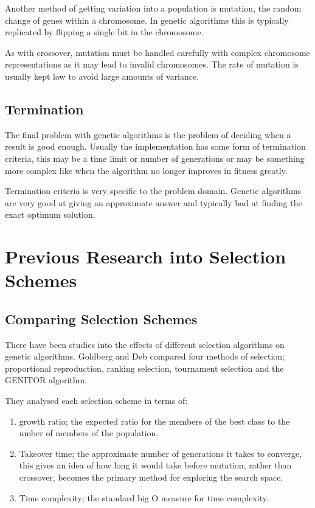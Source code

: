 \documentclass[10pt, a4paper]{article}
\begin{document}
Another method of getting variation into a population is mutation, the random
change of genes within a chromosome. In genetic algorithms this is typically
replicated by flipping a single bit in the chromosome.

As with crossover, mutation must be handled carefully with complex chromosome
representations as it may lead to invalid chromosomes. The rate of mutation 
is usually kept low to avoid large amounts of variance.


\subsection{Termination}

The final problem with genetic algorithms is the problem of deciding when a 
result is good enough. Usually the implementation has some form of termination
criteria, this may be a time limit or number of generations or may be something
more complex like when the algorithm no longer improves in fitness greatly.

Termination criteria is very specific to the problem domain. Genetic algorithms
are very good at giving an approximate answer and typically bad at finding the
exact optimum solution.

\FloatBarrier

\newpage
\section{Previous Research into Selection Schemes}
\label{sec:selection-algorithms}


\subsection{Comparing Selection Schemes}
There have been studies into the effects of different selection algorithms on 
genetic algorithms. Goldberg and Deb\cite{Goldberg1991Comparative} compared
four methods of selection; proportional reproduction, ranking selection,
tournament selection and the GENITOR algorithm.%

They analysed each selection scheme in terms of:

\begin{enumerate}
\item growth ratio; the expected ratio for the members of the best class to the
umber of members of the population.
\item Takeover time; the approximate number of generations it takes
to converge, this gives an idea of how long it would take before mutation,
rather than crossover, becomes the primary method for exploring the search
space. 
\item Time complexity; the standard big O measure for time complexity.
\end{enumerate}
\end{document}

